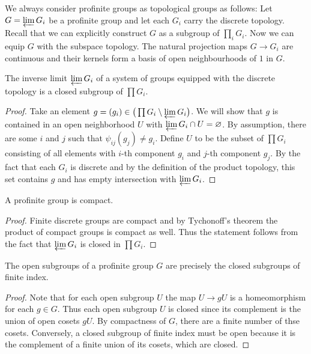 \begin{remark}
	We always consider profinite groups as topological groups as follows: Let $G = \varprojlim G_i$ be a profinite group and let each $G_i$ carry the discrete topology. Recall that we can explicitly construct $G$ as a subgroup of $\prod_i G_i$. Now we can equip $G$ with the subspace topology. The natural projection maps $G \to G_i$ are continuous and their kernels form a basis of open neighbourhoods of $1$ in $G$.
\end{remark}

\begin{lemma}
	The inverse limit $\varprojlim G_i$ of a system of groups equipped with the discrete topology is a closed subgroup of $\prod G_i$.
\end{lemma}

\begin{proof}
	Take an element $g = (g_i) \in \big(\prod G_i \setminus \varprojlim G_i \big)$. We will show that $g$ is contained in an open neighborhood $U$ with $\varprojlim G_i \cap U  = \varnothing$. By assumption, there are some $i$ and $j$ such that $\psi_{ij}(g_j) \neq g_i$. Define $U$ to be the subset of $\prod G_i$ consisting of all elements with $i$-th component $g_i$ and $j$-th component $g_j$. By the fact that each $G_i$ is discrete and by the definition of the product topology, this set contains $g$ and has empty intersection with $\varprojlim G_i$.
\end{proof}

\begin{lemma}
	A profinite group is compact.
\end{lemma}

\begin{proof}
	Finite discrete groups are compact and by Tychonoff's theorem the product of compact groups is compact as well. Thus the statement follows from the fact that $\varprojlim G_i$ is closed in $\prod G_i$.
\end{proof}

\begin{corollary}
	The open subgroups of a profinite group $G$ are precisely the closed subgroups of finite index.
\end{corollary}

\begin{proof}
	Note that for each open subgroup $U$ the map $U \to gU$ is a homeomorphism for each $g \in G$. Thus each open subgroup $U$ is closed since its complement is the union of open cosets $gU$. By compactness of $G$, there are a finite number of thse cosets. Conversely, a closed subgroup of finite index must be open because it is the complement of a finite union of its cosets, which are closed.
\end{proof}

